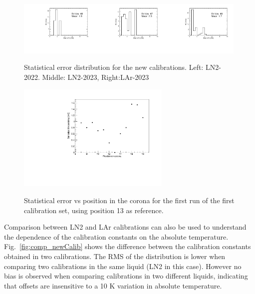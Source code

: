 \begin{figure}[htbp]
    \centering
    {\includegraphics[width=0.33\textwidth]{images/figure_19_a.pdf}}{\includegraphics[width=0.33\textwidth]{images/figure_19_b.pdf}}{\includegraphics[width=0.33\textwidth]{images/figure_19_c.pdf}}
    \caption{Statistical error distribution for the new calibrations. Left: LN2-2022. Middle: LN2-2023, Right:LAr-2023}
    \label{fig:newCalib_stat}
    \end{figure}

\begin{figure}[htbp]
\centering
{\includegraphics[width=0.65\textwidth]{images/figure_20.pdf}}
\caption{Statistical error vs position in the corona for the first run of the first calibration set, using position 13 as reference.}
\label{fig:newCalib_statVsChannel}
\end{figure}

Comparison between LN2 and LAr calibrations can also be used to understand the dependence of the calibration constants on the absolute temperature. Fig.~\ref{fig:comp_newCalib} shows the difference between the calibration constants obtained in two calibrations. The RMS of the distribution is lower when comparing two calibrations in the same liquid (LN2 in this case). However no bias is observed when comparing calibrations in two different liquids, indicating that offsets are insensitive to a 10 K variation in absolute temperature.

